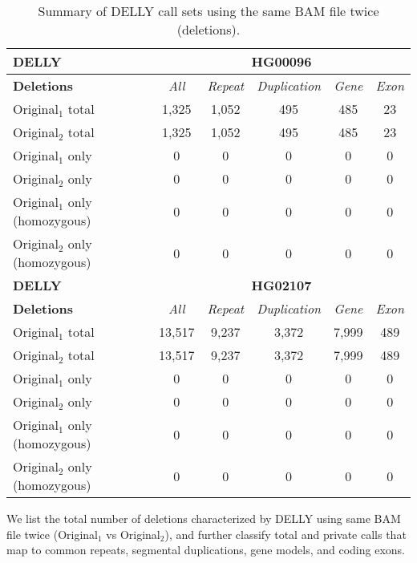 \clearpage

\begin{table}[htb]
\caption{ Summary of DELLY call sets using the same BAM file twice (deletions). }
\begin{center}
\begin{tabular}{|l|c||c|c|c|c|}
\hline
{\bf DELLY} & \multicolumn{5}{|c|}{\bf HG00096} \\
\hline
\cline{2-6}
{\bf Deletions} & {\it All} & {\it Repeat} & {\it Duplication} & {\it Gene} & {\it Exon} \\
\hline
Original$_1$ total & 1,325 & 1,052 & 495 & 485 & 23\\ 
\hline
Original$_2$ total & 1,325 & 1,052 & 495 & 485 & 23\\ 
\hline
Original$_1$ only & 0 & 0 & 0 & 0 & 0\\ 
\hline
Original$_2$ only & 0 & 0 & 0 & 0 & 0\\ 
\hline
Original$_1$ only (homozygous) & 0 & 0 & 0 & 0 & 0\\ 
\hline
Original$_2$ only (homozygous) & 0 & 0 & 0 & 0 & 0\\ 
\hline
\hline
{\bf DELLY} & \multicolumn{5}{|c|}{\bf HG02107} \\
\hline
\cline{2-6}
{\bf Deletions} & {\it All} & {\it Repeat} & {\it Duplication} & {\it Gene} & {\it Exon} \\
\hline
Original$_1$ total & 13,517 & 9,237 & 3,372 & 7,999 & 489\\ 
\hline
Original$_2$ total & 13,517 & 9,237 & 3,372 & 7,999 & 489\\ 
\hline
Original$_1$ only & 0 & 0 & 0 & 0 & 0\\ 
\hline
Original$_2$ only & 0 & 0 & 0 & 0 & 0\\ 
\hline
Original$_1$ only (homozygous) & 0 & 0 & 0 & 0 & 0\\ 
\hline
Original$_2$ only (homozygous) & 0 & 0 & 0 & 0 & 0\\ 
\hline
\end{tabular}
\end{center}
{\footnotesize We list the total number of deletions characterized by DELLY using same BAM file twice (Original$_1$ vs Original$_2$), 
and further classify total and private calls that map to common repeats, segmental duplications, gene models, and coding exons.}
\label{supptab:orig-vs-orig2-delly-deletions}
\end{table}

